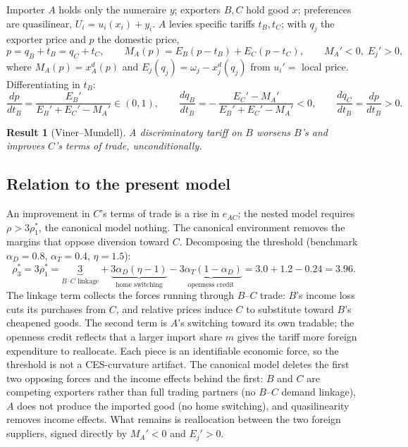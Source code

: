 \documentclass[11pt]{article}
\newtheorem{result}{Result}[section]
\begin{document}
Importer $A$ holds only the numeraire $y$; exporters $B, C$ hold good $x$; preferences are quasilinear, $U_i = u_i(x_i) + y_i$. $A$ levies specific tariffs $t_B, t_C$; with $q_j$ the exporter price and $p$ the domestic price,
\begin{equation}
p = q_B + t_B = q_C + t_C,
\qquad
M_A(p) = E_B(p - t_B) + E_C(p - t_C),
\qquad M_A' < 0, \; E_j' > 0 ,
\label{eq:pta-mc}
\end{equation}
where $M_A(p) = x_A^d(p)$ and $E_j(q_j) = \omega_j - x_j^d(q_j)$ from $u_i' = $ local price. Differentiating in $t_B$:
\begin{equation}
\frac{dp}{dt_B} = \frac{E_B'}{E_B' + E_C' - M_A'} \in (0, 1),
\qquad
\frac{dq_B}{dt_B} = -\,\frac{E_C' - M_A'}{E_B' + E_C' - M_A'} < 0,
\qquad
\frac{dq_C}{dt_B} = \frac{dp}{dt_B} > 0 .
\label{eq:pta-cs}
\end{equation}

\begin{result}[Viner--Mundell]
A discriminatory tariff on $B$ worsens $B$'s and improves $C$'s terms of trade, unconditionally.
\label{res:viner}
\end{result}

\subsection{Relation to the present model}

An improvement in $C$'s terms of trade is a rise in $e_{AC}$; the nested model requires $\rho > 3\rho_1^*$, the canonical model nothing. The canonical environment removes the margins that oppose diversion toward $C$. Decomposing the threshold (benchmark $\alpha_D = 0.8$, $\alpha_T = 0.4$, $\eta = 1.5$):
\begin{equation}
\rho_3^* = 3\rho_1^* = \underbrace{3}_{\text{$B$--$C$ linkage}}
+ \underbrace{3\alpha_D(\eta-1)}_{\text{home switching}}
- \underbrace{3\alpha_T(1-\alpha_D)}_{\text{openness credit}}
= 3.0 + 1.2 - 0.24 = 3.96 .
\label{eq:pta-decomp}
\end{equation}
The linkage term collects the forces running through $B$--$C$ trade: $B$'s income loss cuts its purchases from $C$, and relative prices induce $C$ to substitute toward $B$'s cheapened goods. The second term is $A$'s switching toward its own tradable; the openness credit reflects that a larger import share $m$ gives the tariff more foreign expenditure to reallocate. Each piece is an identifiable economic force, so the threshold is not a CES-curvature artifact. The canonical model deletes the first two opposing forces and the income effects behind the first: $B$ and $C$ are competing exporters rather than full trading partners (no $B$--$C$ demand linkage), $A$ does not produce the imported good (no home switching), and quasilinearity removes income effects. What remains is reallocation between the two foreign suppliers, signed directly by $M_A' < 0$ and $E_j' > 0$.
\end{document}
